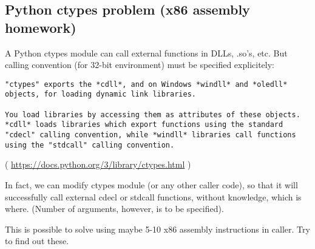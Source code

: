 \subsection{Python ctypes problem (x86 assembly homework)}

A Python ctypes module can call external functions in DLLs, .so's, etc.
But calling convention (for 32-bit environment) must be specified explicitely:

\begin{lstlisting}
"ctypes" exports the *cdll*, and on Windows *windll* and *oledll*
objects, for loading dynamic link libraries.

You load libraries by accessing them as attributes of these objects.
*cdll* loads libraries which export functions using the standard
"cdecl" calling convention, while *windll* libraries call functions
using the "stdcall" calling convention.
\end{lstlisting}
( \url{https://docs.python.org/3/library/ctypes.html} )

In fact, we can modify ctypes module (or any other caller code), so that it will successfully
call external cdecl or stdcall functions, without knowledge, which is where.
(Number of arguments, however, is to be specified).

This is possible to solve using maybe 5-10 x86 assembly instructions in caller.
Try to find out these.


